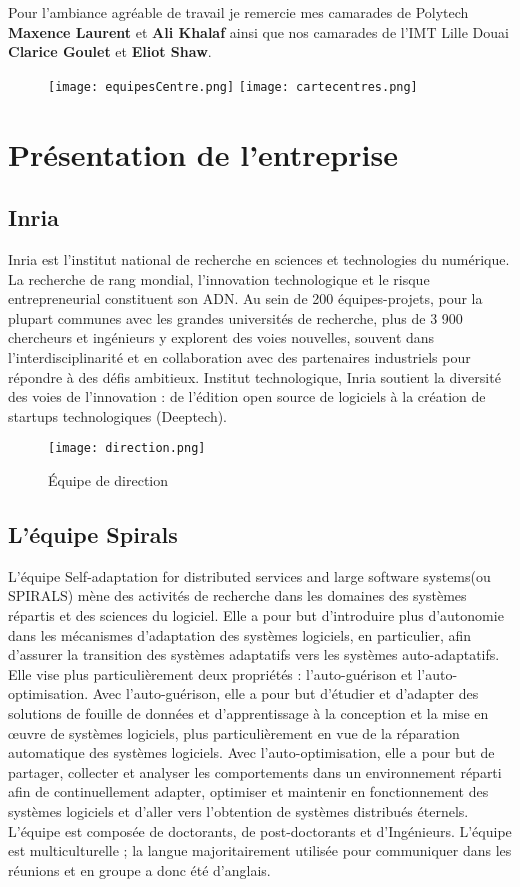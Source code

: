 \documentclass[oneside,a4paper,12pt]{article}
\begin{document}
Pour l'ambiance agréable de travail je remercie mes camarades de Polytech \textbf{Maxence Laurent} et \textbf{Ali Khalaf} ainsi que nos camarades de l'IMT Lille Douai \textbf{Clarice Goulet} et \textbf{Eliot Shaw}.

\newpage

\begin{figure}[h]
	\centering
	\texttt{[image: equipesCentre.png]}
	\texttt{[image: cartecentres.png]}
\end{figure}

\section{Présentation de l'entreprise}
\subsection{Inria}
Inria est l’institut national de recherche en sciences et technologies du numérique. La recherche de rang mondial, l’innovation technologique et le risque entrepreneurial constituent son ADN. Au sein de 200 équipes-projets, pour la plupart communes avec les grandes universités de recherche, plus de 3 900 chercheurs et ingénieurs y explorent des voies nouvelles, souvent dans l’interdisciplinarité et en collaboration avec des partenaires industriels pour répondre à des défis ambitieux.
Institut technologique, Inria soutient la diversité des voies de l’innovation : de l’édition open source de logiciels à la création de startups technologiques (Deeptech).

\begin{figure}[h]
	\centering
	\texttt{[image: direction.png]}
	\caption{\'Equipe de direction}
\end{figure}

\subsection{L'équipe Spirals}
L'équipe Self-adaptation for distributed services and large software systems(ou SPIRALS) mène des activités de recherche dans les domaines des systèmes répartis et des sciences du logiciel. 
Elle a pour but d'introduire plus d'autonomie dans les mécanismes d'adaptation des systèmes logiciels, en particulier, afin d'assurer la transition des systèmes adaptatifs vers les systèmes auto-adaptatifs. 
Elle vise plus particulièrement deux propriétés : l'auto-guérison et l'auto-optimisation. 
Avec l'auto-guérison, elle a pour but d'étudier et d'adapter des solutions de fouille de données et d'apprentissage à la conception et la mise en œuvre de systèmes logiciels, plus particulièrement en vue de la réparation automatique des systèmes logiciels. 
Avec l'auto-optimisation, elle a pour but de partager, collecter et analyser les comportements dans un environnement réparti afin de continuellement adapter, optimiser et maintenir en fonctionnement des systèmes logiciels et d'aller vers l'obtention de systèmes distribués éternels.
L'équipe est composée de doctorants, de post-doctorants et d'Ingénieurs. L'équipe est multiculturelle ; la langue majoritairement utilisée pour communiquer dans les réunions et en groupe a donc été d'anglais.
\end{document}
